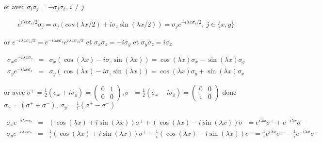 \documentclass[submission,Phys,10pt]{SciPost}%
\begin{document}
{{ et avec $\sigma_i \sigma_j = - \sigma_j \sigma_i,  ~ i \neq j $ 

\begin{eqnarray*}
	e^{i \lambda x \sigma_z /2} \sigma_j = \sigma_j (cos  ( \lambda x /2 ) + i \sigma_z  \sin ( \lambda x /2 )) = 	 \sigma_j e^{ - i \lambda x \sigma_z /2} ,~ j\in\{ x , y \}
\end{eqnarray*}


or $e^{- i \lambda x \sigma_z /2 } = e^{ -i \lambda x \sigma_z } e^{ i \lambda x \sigma_z /2 }$ et $\sigma_x \sigma_z = - i \sigma_y$ et $\sigma_y \sigma_z = i \sigma_x$

\begin{eqnarray*}
	\sigma_x e^{- i \lambda x \sigma_z }   & = & 	\sigma_x ( \cos  ( \lambda x) - i \sigma_z  \sin (\lambda x   ) )  = \cos  ( \lambda x  ) 	\sigma_x   -  \sin ( \lambda x ) \sigma_y \\
	\sigma_y e^{ - i \lambda x \sigma_z   }   & = & 	\sigma_y ( \cos  ( \lambda x) - i \sigma_z  \sin (\lambda x   ) )  = 	\cos  ( \lambda x  ) 	\sigma_y   +  \sin ( \lambda x ) \sigma_x
\end{eqnarray*}



or avec $\sigma^+ = \frac{1}2 ( \sigma_x + i \sigma_y )  = \begin{pmatrix}
    0 & 1\\
    0 & 0
    \end{pmatrix},
    \sigma^- = \frac{1}2 ( \sigma_x - i \sigma_y )  = \begin{pmatrix}
    0 & 0\\
    1 & 0
    \end{pmatrix}$ donc $\sigma_x =  ( \sigma^+ + \sigma^-) ,~ \sigma_y = \frac{1}{i} ( \sigma^+ - \sigma^-)$
    
\begin{eqnarray*}
	\sigma_x e^{  -i \lambda x \sigma_z  }   & = & 	 ( \cos (\lambda x)  + i \sin (\lambda x )  ) \sigma^+ + ( \cos (\lambda x) - i \sin (\lambda x) ) \sigma^- = e^{i \lambda x  }\sigma^+ + e^{-i \lambda x }\sigma^-  \\
	\sigma_y e^{ - i \lambda x \sigma_z  }   & = & 	 \frac{1}{i} ( \cos (\lambda x)  + i \sin (\lambda x )  ) \sigma^+  - \frac{1}{i} ( \cos (\lambda x) - i \sin (\lambda x) ) \sigma^- = \frac{1}{i}e^{i \lambda x  }\sigma^+ -\frac{1}{i} e^{-i \lambda x }\sigma^- \end{eqnarray*}
    
    
 

}}
\end{document}
